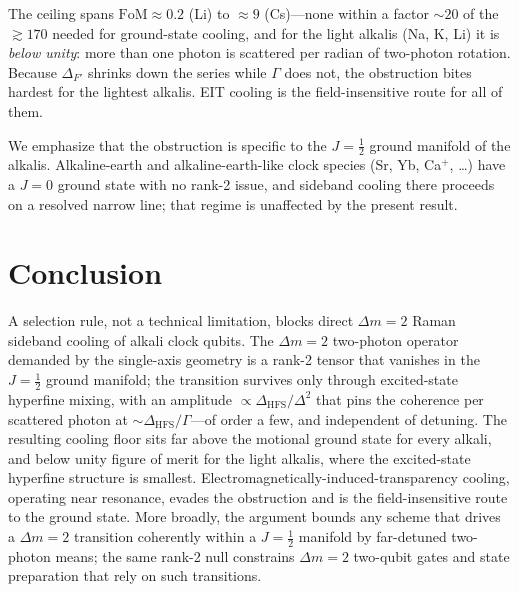 \documentclass[aps,pra,reprint,amsmath,amssymb,superscriptaddress,floatfix]{revtex4-2}
\newcommand{\Dm}{\Delta m}
\newcommand{\dhfs}{\Delta_{\mathrm{HFS}}}
\newcommand{\FoM}{\mathrm{FoM}}
\begin{document}
The ceiling spans $\FoM\approx0.2$ (Li) to $\approx9$ (Cs)---none within a factor $\sim20$ of the
$\gtrsim170$ needed for ground-state cooling, and for the light alkalis (Na, K, Li) it is
\emph{below unity}: more than one photon is scattered per radian of two-photon rotation. Because
$\Delta_{F'}$ shrinks down the series while $\Gamma$ does not, the obstruction bites hardest for
the lightest alkalis. EIT cooling is the field-insensitive route for all of them.

We emphasize that the obstruction is specific to the $J=\tfrac12$ ground manifold of the alkalis.
Alkaline-earth and alkaline-earth-like clock species (Sr, Yb, Ca$^+$, \ldots) have a $J=0$ ground
state with no rank-2 issue, and sideband cooling there proceeds on a resolved narrow line; that
regime is unaffected by the present result.

\section{Conclusion}\label{sec:conclusion}
A selection rule, not a technical limitation, blocks direct $\Dm=2$ Raman sideband cooling of
alkali clock qubits. The $\Dm=2$ two-photon operator demanded by the single-axis geometry is a
rank-2 tensor that vanishes in the $J=\tfrac12$ ground manifold; the transition survives only
through excited-state hyperfine mixing, with an amplitude $\propto\dhfs/\Delta^2$ that pins the
coherence per scattered photon at $\sim\dhfs/\Gamma$---of order a few, and independent of detuning.
The resulting cooling floor sits far above the motional ground state for every alkali, and below
unity figure of merit for the light alkalis, where the excited-state hyperfine structure is
smallest. Electromagnetically-induced-transparency cooling, operating near resonance, evades the
obstruction and is the field-insensitive route to the ground state. More broadly, the argument
bounds any scheme that drives a $\Dm=2$ transition coherently within a $J=\tfrac12$ manifold by
far-detuned two-photon means; the same rank-2 null constrains $\Dm=2$ two-qubit gates and state
preparation that rely on such transitions.

\begin{acknowledgments}
\end{acknowledgments}

\appendix
\end{document}
